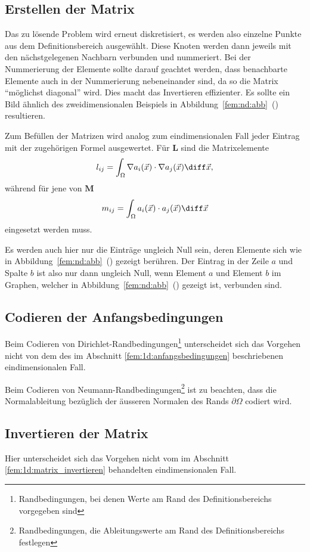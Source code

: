 \subsection{Erstellen der Matrix}
Das zu lösende Problem wird erneut diskretisiert, es werden also einzelne Punkte aus dem Definitionsbereich ausgewählt.
Diese Knoten werden dann jeweils mit den nächstgelegenen Nachbarn verbunden und nummeriert.
Bei der Nummerierung der Elemente sollte darauf geachtet werden, dass benachbarte Elemente auch in der Nummerierung nebeneinander sind, da so die Matrix ``möglichst diagonal'' wird.
Dies macht das Invertieren effizienter.
Es sollte ein Bild ähnlich des zweidimensionalen Beispiels in Abbildung~\ref{fem:nd:abb}~()
resultieren.

Zum Befüllen der Matrizen wird analog zum eindimensionalen Fall jeder Eintrag mit der zugehörigen Formel ausgewertet.
Für $\mathbf{L}$ sind die Matrixelemente
\begin{equation*}
    l_{ij} = \int_{\Omega} \nabla a_i(\vec{x}) \cdot \nabla a_j(\vec{x}) \diff \vec{x},
\end{equation*}
während für jene von $\mathbf{M}$ 
\begin{equation*}
    m_{ij} = \int_{\Omega} a_i(\vec{x}) \cdot a_j(\vec{x}) \diff \vec{x}
\end{equation*}
eingesetzt werden muss.

Es werden auch hier nur die Einträge ungleich Null sein, deren Elemente sich wie in Abbildung~\ref{fem:nd:abb}~() gezeigt berühren.
Der Eintrag in der Zeile $a$ und Spalte $b$ ist also nur dann ungleich Null, wenn Element $a$ und Element $b$ im Graphen, welcher in Abbildung~\ref{fem:nd:abb}~() gezeigt ist, verbunden sind.

\subsection{Codieren der Anfangsbedingungen}
Beim Codieren von Dirichlet-Randbedingungen\footnote{Randbedingungen, bei denen Werte am Rand des Definitionsbereichs vorgegeben sind}
unterscheidet sich das Vorgehen nicht von dem des im Abschnitt \ref{fem:1d:anfangsbedingungen} beschriebenen eindimensionalen Fall. 

Beim Codieren von Neumann-Randbedingungen\footnote{Randbedingungen, die Ableitungswerte am Rand des Definitionsbereichs festlegen}
ist zu beachten, dass die Normalableitung bezüglich der äusseren Normalen des Rands $\partial \Omega$ codiert wird.

\subsection{Invertieren der Matrix}
Hier unterscheidet sich das Vorgehen nicht vom im Abschnitt \ref{fem:1d:matrix_invertieren} behandelten eindimensionalen Fall.
